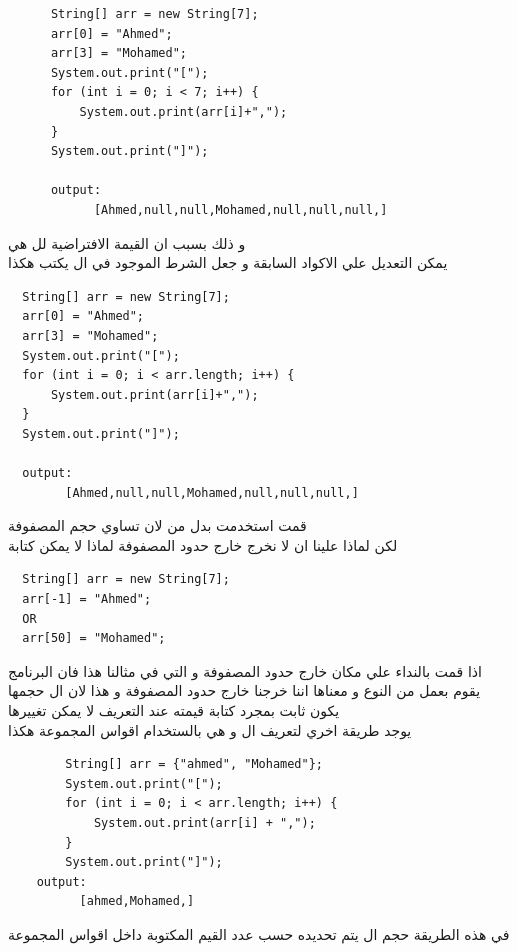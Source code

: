 \begin{verbatim}
      String[] arr = new String[7];
      arr[0] = "Ahmed";
      arr[3] = "Mohamed";
      System.out.print("[");
      for (int i = 0; i < 7; i++) {
          System.out.print(arr[i]+",");
      }
      System.out.print("]");

      output:
            [Ahmed,null,null,Mohamed,null,null,null,]
\end{verbatim}
\begin{AR}
  و ذلك بسبب ان القيمة الافتراضية لل هي 
  \\
  يمكن التعديل علي الاكواد السابقة و جعل الشرط الموجود في ال يكتب هكذا
\end{AR}
\begin{verbatim}
  String[] arr = new String[7];
  arr[0] = "Ahmed";
  arr[3] = "Mohamed";
  System.out.print("[");
  for (int i = 0; i < arr.length; i++) {
      System.out.print(arr[i]+",");
  }
  System.out.print("]");

  output:
        [Ahmed,null,null,Mohamed,null,null,null,]
\end{verbatim}
\begin{AR}
  قمت استخدمت  بدل من  لان  تساوي حجم المصفوفة
  \\
  لكن لماذا علينا ان لا نخرج خارج حدود المصفوفة لماذا لا يمكن كتابة 
\end{AR}
\begin{verbatim}
  String[] arr = new String[7];
  arr[-1] = "Ahmed";
  OR
  arr[50] = "Mohamed";
\end{verbatim}
\begin{AR}
  اذا قمت بالنداء علي مكان خارج حدود المصفوفة و التي في مثالنا هذا  فان البرنامج يقوم بعمل  من النوع  و معناها اننا خرجنا خارج حدود المصفوفة
  و هذا لان ال حجمها يكون ثابت بمجرد كتابة قيمته عند التعريف لا يمكن تغييرها
  \\
  يوجد طريقة اخري لتعريف ال و هي بالستخدام اقواس المجموعة هكذا
\end{AR}
\begin{verbatim}
        String[] arr = {"ahmed", "Mohamed"};
        System.out.print("[");
        for (int i = 0; i < arr.length; i++) {
            System.out.print(arr[i] + ",");
        }
        System.out.print("]");
    output:
          [ahmed,Mohamed,]
\end{verbatim}
\begin{AR}
  في هذه الطريقة حجم ال يتم تحديده حسب عدد القيم المكتوبة داخل اقواس المجموعة
\end{AR}


